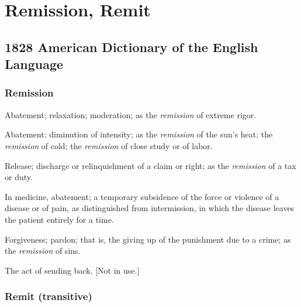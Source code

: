 \section{Remission, Remit}
	\label{REMISSION}
	

\subsection{1828 American Dictionary of the English Language} %
	\label{REMISSION-1828}
	
	\subsubsection{Remission}

		\begin{compactitem}
			\item[1] Abatement; relaxation; moderation; as the \textit{remission} of extreme rigor.
			\item[2] Abatement; diminution of intensity; as the \textit{remission} of the sun's heat; the \textit{remission} of cold; the \textit{remission} of close study or of labor.
			\item[3] Release; discharge or relinquishment of a claim or right; as the \textit{remission} of a tax or duty.
			\item[4] In medicine, abatement; a temporary subsidence of the force or violence of a disease or of pain, as distinguished from intermission, in which the disease leaves the patient entirely for a time.
			\item[5] Forgiveness; pardon; that is, the giving up of the punishment due to a crime; as the \textit{remission} of sins.
			\item[6] The act of sending back. [Not in use.]
		\end{compactitem}
		
	\subsubsection{Remit (transitive)}
	
